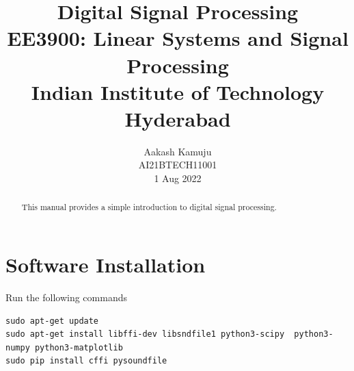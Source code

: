 \documentclass[journal,12pt,twocolumn]{IEEEtran}
\numberwithin{equation}{section}
\renewcommand{\thefigure}{\theenumi}
\renewcommand\thesection{\arabic{section}}
\begin{document}
                             
\title{ Digital Signal Processing \\ \Large EE3900: Linear Systems and Signal Processing \\ \large Indian Institute of Technology Hyderabad}
\author{Aakash Kamuju \\ \normalsize AI21BTECH11001 \\ \vspace*{20pt} \normalsize 1 Aug 2022}   
 \maketitle 
 \tableofcontents


\renewcommand{\thefigure}{\theenumi}
\renewcommand{\thetable}{\theenumi}



\bigskip

\begin{abstract}
This manual provides a simple introduction to digital signal processing.
\end{abstract}
\section{Software Installation}
Run the following commands
\begin{lstlisting}
sudo apt-get update
sudo apt-get install libffi-dev libsndfile1 python3-scipy  python3-numpy python3-matplotlib 
sudo pip install cffi pysoundfile 
\end{lstlisting}
\end{document}
